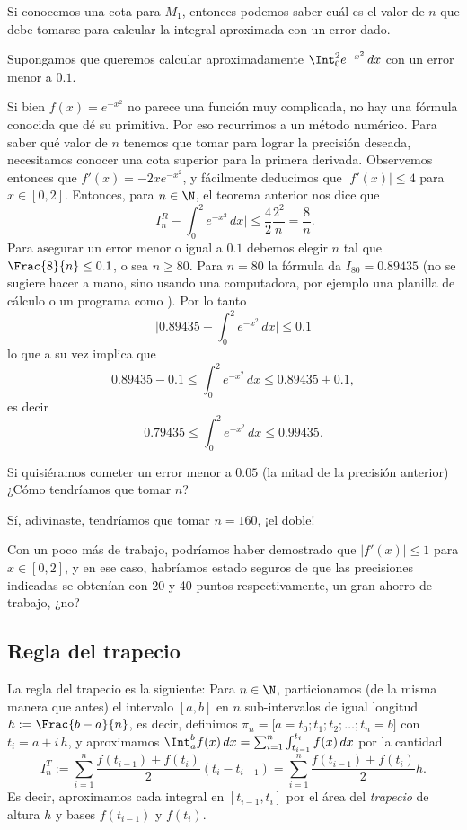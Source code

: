 \begin{obs}
 Si conocemos una cota para $M_1$, entonces podemos saber cuál es el valor de $n$ que debe tomarse para calcular la integral aproximada con un error dado.
\end{obs}

\begin{ejemplo}
 Supongamos que queremos calcular aproximadamente $\Int_0^2 e^{-x^2} \, dx$ con un error menor a $0.1$.

Si bien $f(x) = e^{-x^2}$ no parece una función muy complicada, no hay una fórmula conocida que dé su primitiva. Por eso recurrimos a un método numérico. Para saber qué valor de $n$ tenemos que tomar para lograr la precisión deseada, necesitamos conocer una cota superior para la primera derivada. Observemos entonces que $f'(x) = -2x e^{-x^2}$, y fácilmente deducimos que $|f'(x)| \le 4$ para $x \in [0,2]$. Entonces, para $n \in \N$, el teorema anterior nos dice que
\[
 \Big| I_n^R  - \int_0^2 e^{-x^2} \, dx \Big| \le \frac{4}{2} \frac{2^2}{n}
= \frac8n.
\]
Para asegurar un error menor o igual a $0.1$ debemos elegir $n$ tal que $\Frac{8}{n} \le 0.1$, o sea $n \ge 80$.
Para $n = 80$ la fórmula da $I_{80} = 0.89435$ (no se sugiere hacer a mano, sino usando una computadora, por ejemplo una planilla de cálculo o un programa como \MO). Por lo tanto
\[
 \Big| 0.89435  - \int_0^2 e^{-x^2} \, dx \Big| \le 0.1
\]
lo que a su vez implica que
\[
 0.89435 - 0.1 \le \int_0^2 e^{-x^2} \, dx \le 0.89435 + 0.1,
\]
es decir
\[
 0.79435 \le \int_0^2 e^{-x^2} \, dx \le 0.99435.
\]

Si quisiéramos cometer un error menor a $0.05$ (la mitad de la precisión anterior) ¿Cómo tendríamos que tomar $n$?

Sí, adivinaste, tendríamos que tomar $n=160$, ¡el doble!

Con un poco más de trabajo, podríamos haber demostrado que $|f'(x)| \le 1$ para $x \in [0,2]$, y en ese caso, habríamos estado seguros de que las precisiones indicadas se obtenían con 20 y 40 puntos respectivamente, un gran ahorro de trabajo, ¿no?
\end{ejemplo}



\subsection{Regla del trapecio}

La regla del trapecio es la siguiente: Para $n\in\N$, particionamos (de la misma manera que antes) el intervalo $[a,b]$ en $n$ sub-intervalos de igual longitud $h := \Frac{b-a}{n}$, es decir, definimos $\pi_n = \big[a = t_0; t_1; t_2; \dots ; t_n = b\big]$ con $t_i = a + i\, h$, y aproximamos $\Int_a^b f(x) \, dx = \sum_{i=1}^ n \int_{t_{i-1}}^{t_i} f(x)\,dx$ por la cantidad
\[
 I_n^T := \sum_{i=1}^n \frac{f(t_{i-1})+f(t_i)}2 (t_{i} - t_{i-1}) = \sum_{i=1}^n \frac{f(t_{i-1})+f(t_i)}2 h .
\]
Es decir, aproximamos cada integral en $[t_{i-1},t_i]$ por el área del \emph{trapecio} de altura $h$ y bases $f(t_{i-1})$ y $f(t_i)$.

